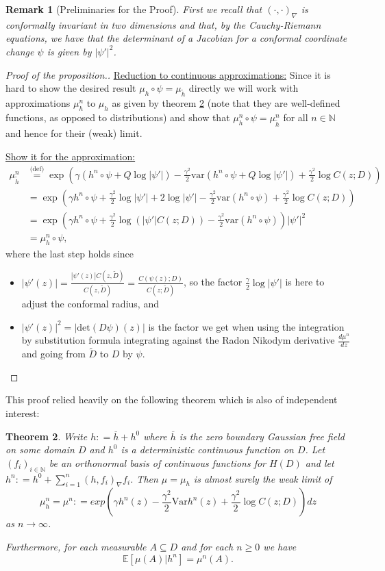 \documentclass[11pt,reqno]{amsart}
\numberwithin{equation}{section}
\newtheorem{thm}{Theorem}[section]
\newtheorem{rem}[thm]{Remark}
\newcommand{\eqbydef}{\mathrel{\stackrel{\text{(def)}}{=}}}
\newcommand{\deq}{\mathrel{\mathop:}=}
\begin{document}
\begin{rem}[Preliminaries for the Proof]
	First we recall that $(\cdot,\cdot)_\nabla$ is conformally invariant in two dimensions and that, by the Cauchy-Riemann equations, we have that the determinant of a Jacobian for a conformal coordinate change $\psi$ is given by $|\psi'|^2$.
\end{rem}
\begin{proof}[Proof of the proposition.]
	\underline{Reduction to continuous approximations:} Since it is hard to show the desired result $\mu_h\circ\psi = \mu_{\tilde h}$ directly we will work with approximations $\mu_h^n$ to $\mu_h$ as given by theorem \ref{thm:approximationofhwithhn} (note that they are well-defined functions, as opposed to distributions) and show that $\mu_h^n\circ\psi=\mu_{\tilde h}^n$ for all $n\in\mathbb N$ and hence for their (weak) limit.
	
	\underline{Show it for the approximation:}
	\begin{align*}
		\mu_{\tilde h}^n&\eqbydef
		\exp\left(\gamma(h^n\circ\psi+Q\log|\psi'|)-\frac{\gamma^2}{2}\text{var}(h^n\circ\psi+Q\log|\psi'|)+\frac{\gamma^2}{2}\log C(z;D) \right)\\
		&=\exp\left(\gamma h^n\circ\psi+\frac{\gamma^2}{2}\log|\psi'|+2\log|\psi'|-\frac{\gamma^2}{2}\text{var}(h^n\circ\psi)+\frac{\gamma^2}{2}\log C(z;D) \right)\\
		&=\exp\left(\gamma h^n\circ\psi+\frac{\gamma^2}{2}\log(|\psi'|C(z;D))-\frac{\gamma^2}{2}\text{var}(h^n\circ\psi)\right)|\psi'|^2\\
		&=\mu_h^n\circ\psi,
	\end{align*}
	where the last step holds since \begin{itemize}
		\item $|\psi'(z)|=\frac{|\psi'(z)|C(z,\tilde D)}{C(z,\tilde D)}=\frac{C(\psi(z);D)}{C(z;\tilde D)}$, so the factor $\frac{\gamma}{2}\log|\psi'|$ is here to adjust the conformal radius, and
		\item $|\psi'(z)|^2 = |\text{det}(D\psi)(z)|$ is the factor we get when using the integration by substitution formula integrating against the Radon Nikodym derivative $\frac{d\mu^n}{dz}$ and going from $\tilde D$ to $D$ by $\psi$.
	\end{itemize}
\end{proof}

This proof relied heavily on the following theorem which is also of independent interest:

\begin{thm}\label{thm:approximationofhwithhn}
	Write $h\deq \overline h+h^0$ where $\overline h$ is the zero boundary Gaussian free field on some domain $D$ and $h^0$ is a deterministic continuous function on $D$. Let $(f_i)_{i\in\mathbb N}$ be an orthonormal basis of continuous functions for $H(D)$ and let $h^n\deq h^0+\sum_{i=1}^n (h,f_i)_\nabla f_i$. Then $\mu=\mu_h$ is almost surely the weak limit of $$\mu_h^n=\mu^n\deq exp\left(\gamma h^n(z)-\frac{\gamma^2}{2}\text{Var}h^n(z)+\frac{\gamma^2}{2}\log C(z;D) \right)dz$$
	as $n\rightarrow\infty$.
	
	Furthermore, for each measurable $A\subseteq D$ and for each $n\geq 0$ we have $$\mathbb E[\mu(A)|h^n]=\mu^n(A).$$
\end{thm}
\end{document}
